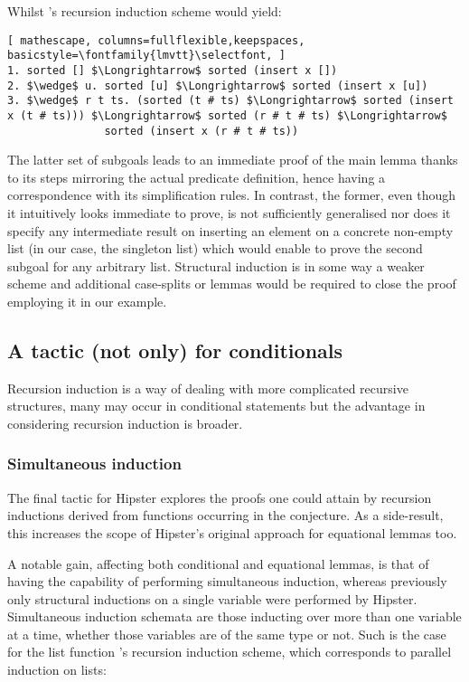 \noindent Whilst 's recursion induction scheme would yield:

\begin{lstlisting}[ mathescape, columns=fullflexible,keepspaces, basicstyle=\fontfamily{lmvtt}\selectfont, ]
1. sorted [] $\Longrightarrow$ sorted (insert x [])
2. $\wedge$ u. sorted [u] $\Longrightarrow$ sorted (insert x [u])
3. $\wedge$ r t ts. (sorted (t # ts) $\Longrightarrow$ sorted (insert x (t # ts))) $\Longrightarrow$ sorted (r # t # ts) $\Longrightarrow$
               sorted (insert x (r # t # ts))
\end{lstlisting}

The latter set of subgoals leads to an immediate proof of the main lemma thanks to its steps mirroring the actual predicate definition, hence having a correspondence with its simplification rules.
%
In contrast, the former, even though it intuitively looks immediate to prove, is not sufficiently generalised nor does it specify any intermediate result on inserting an element on a concrete non-empty list (in our case, the singleton list) which would enable to prove the second subgoal for any arbitrary list. Structural induction is in some way a weaker scheme and additional case-splits or lemmas would be required to close the proof employing it in our example.


\subsection{A tactic (not only) for conditionals}

Recursion induction is a way of dealing with more complicated recursive structures, many may occur in conditional statements but the advantage in considering recursion induction is broader.

\subsubsection*{Simultaneous induction}

The final tactic for Hipster explores the proofs one could attain by recursion inductions derived from functions occurring in the conjecture.
%
As a side-result, this increases the scope of Hipster's original approach for equational lemmas too.

A notable gain, affecting both conditional and equational lemmas, is that of having the capability of performing simultaneous induction, whereas previously only structural inductions on a single variable were performed by Hipster.
%
Simultaneous induction schemata are those inducting over more than one variable at a time, whether those variables are of the same type or not.
%
Such is the case for the list function 's recursion induction scheme, which corresponds to parallel induction on lists:

